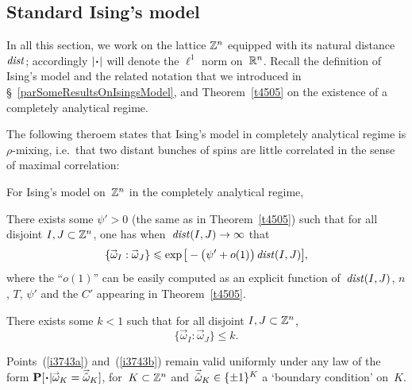 \subsection{Standard Ising's model}

In all this section, we work on the lattice $\mathbb{Z}^n$
equipped with its natural distance $\mathit{dist}$;
accordingly $|\Bcdot|$ will denote the $\ell^1$ norm on~$\mathbb{R}^n$.
Recall the definition of Ising's model and the related notation that we introduced
in \S~\ref{parSomeResultsOnIsingsModel}, and Theorem~\ref{t4505}
on the existence of a completely analytical regime.

The following theroem states that Ising's model in completely analytical regime
is $\rho$-mixing, i.e.\ that two distant bunches of spins
are little correlated in the sense of maximal correlation:
%
\begin{Thm}\label{t3730}
For Ising's model on~$\mathbb{Z}^n$ in the completely analytical regime,
\begin{ienumerate}
\item\label{i3743a} There exists some $\psi'>0$ (the same as in Theorem~\ref{t4505})
such that for all disjoint $I,J\subset\mathbb{Z}^n$, one has when~$\mathit{dist}(I,J)\to\infty$ that
\[\label{f4615}
\{ \vec\omega_I : \vec\omega_J \} \leq \exp\big[-\big(\psi'+o(1)\big) \, \dist(I,J)\big] ,\]
where the ``$o(1)$'' can be
easily computed as an explicit function of~$\mathit{dist}(I,J)$, $n$, $T$, $\psi'$ and the
$C'$ appearing in Theorem~\ref{t4505}.
\item\label{i3743b} There exists some $k<1$ such that for all disjoint $I,J\subset\mathbb{Z}^n$,
\[ \{ \vec\omega_I : \vec\omega_J \} \leq k .\]
\item\label{i5202}
Points~(\ref{i3743a}) and~(\ref{i3743b}) remain valid uniformly under any law of the form
$\Pr[\Bcdot|{\vec\omega_K=\vechat{\omega}_K}]$,
for~$K \subset \mathbb{Z}^n$ and~$\vechat{\omega}_K \in \{\pm1\}^K$ a `boundary condition' on~$K$.
\end{ienumerate}
\end{Thm}

